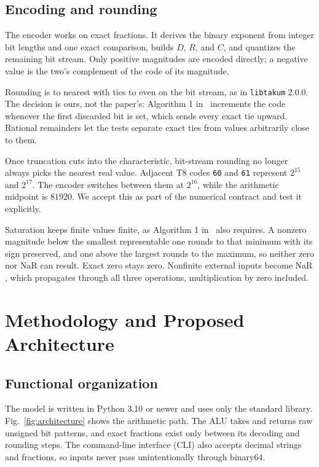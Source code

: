 \documentclass[conference]{IEEEtran}
\newcommand{\NaR}{\mathrm{NaR}}
\newcommand{\code}[1]{\texttt{#1}}
\begin{document}
\subsection{Encoding and rounding}
The encoder works on exact fractions. It derives the binary exponent from
integer bit lengths and one exact comparison, builds $D$, $R$, and $C$, and
quantizes the remaining bit stream. Only positive magnitudes are encoded
directly; a negative value is the two's complement of the code of its magnitude.

Rounding is to nearest with ties to even on the bit stream, as in
\code{libtakum} 2.0.0. The decision is ours, not the paper's: Algorithm 1
in~\cite{takum} increments the code whenever the first discarded bit is set,
which sends every exact tie upward. Rational remainders let the tests separate exact ties from values
arbitrarily close to them.

Once truncation cuts into the characteristic, bit-stream rounding no longer
always picks the nearest real value. Adjacent T8 codes \code{60} and \code{61}
represent $2^{15}$ and $2^{17}$. The encoder switches between them at $2^{16}$,
while the arithmetic midpoint is $81920$. We accept this as part of the
numerical contract and test it explicitly.

Saturation keeps finite values finite, as Algorithm 1 in~\cite{takum} also
requires. A nonzero magnitude below the smallest
representable one rounds to that minimum with its sign preserved, and one above
the largest rounds to the maximum, so neither zero nor $\NaR$ can result. Exact
zero stays zero. Nonfinite external inputs become $\NaR$, which propagates
through all three operations, multiplication by zero included.

\section{Methodology and Proposed Architecture}
\subsection{Functional organization}
The model is written in Python 3.10 or newer and uses only the standard library.
Fig.~\ref{fig:architecture} shows the arithmetic path. The ALU takes and
returns raw unsigned bit patterns, and exact fractions exist only between its
decoding and rounding steps.
The command-line interface (CLI) also accepts decimal strings and fractions, so
inputs never pass unintentionally through binary64.
\end{document}
